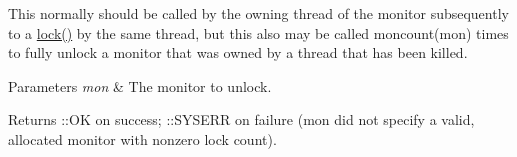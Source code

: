 This normally should be called by the owning thread of the monitor subsequently to a \hyperlink{group__monitors_ga890b5cddd6552af757ba83df0d98411f}{lock()} by the same thread, but this also may be called moncount(mon) times to fully unlock a monitor that was owned by a thread that has been killed.


\begin{DoxyParams}{Parameters}
{\em mon} & The monitor to unlock.\\
\hline
\end{DoxyParams}
\begin{DoxyReturn}{Returns}
\-::\-O\-K on success; \-::\-S\-Y\-S\-E\-R\-R on failure ({\ttfamily mon} did not specify a valid, allocated monitor with nonzero lock count). 
\end{DoxyReturn}
